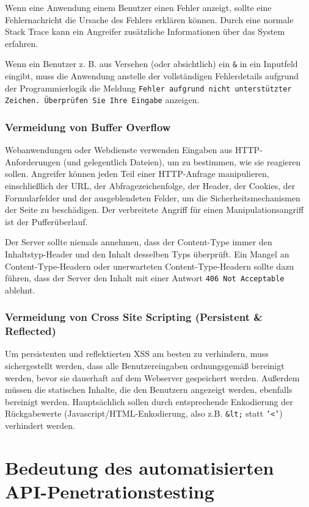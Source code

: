 Wenn eine Anwendung einem Benutzer einen Fehler anzeigt, sollte eine Fehlernachricht die Ursache des Fehlers erklären können. Durch eine normale Stack Trace kann ein Angreifer zusätzliche Informationen über das System erfahren.

Wenn ein Benutzer z. B. aus Versehen (oder absichtlich) ein \texttt{\&} in ein Inputfeld eingibt, muss die Anwendung anstelle der vollständigen Fehlerdetails aufgrund der Programmierlogik die Meldung \texttt{Fehler aufgrund nicht unterstützter Zeichen. Überprüfen Sie Ihre Eingabe} anzeigen\cite{ase17}.

\subsubsection{Vermeidung von Buffer Overflow}

Webanwendungen oder Webdienste verwenden Eingaben aus HTTP-Anforderungen (und gelegentlich Dateien), um zu bestimmen, wie sie reagieren sollen. Angreifer können jeden Teil einer HTTP-Anfrage manipulieren, einschließlich der URL, der Abfragezeichenfolge, der Header, der Cookies, der Formularfelder und der ausgeblendeten Felder, um die Sicherheitsmechanismen der Seite zu beschädigen. Der verbreitete Angriff für einen Manipulationsangriff ist der Pufferüberlauf.

Der Server sollte niemals annehmen, dass der Content-Type immer den Inhaltstyp-Header und den Inhalt desselben Typs überprüft. Ein Mangel an Content-Type-Headern oder unerwarteten Content-Type-Headern sollte dazu führen, dass der
Server den Inhalt mit einer Antwort \texttt{406 Not Acceptable} ablehnt\cite{bofangpre16}.

\subsubsection{Vermeidung von Cross Site Scripting (Persistent \& Reflected)}

Um persistenten und reflektierten XSS am besten zu verhindern, muss sichergestellt werden, dass alle Benutzereingaben ordnungsgemäß bereinigt werden, bevor sie dauerhaft auf dem Webserver gespeichert werden. Außerdem müssen die statischen Inhalte, die den Benutzern angezeigt werden, ebenfalls bereinigt werden. Hauptsächlich sollen durch entsprechende Enkodierung der Rückgabewerte (Javascript/HTML-Enkodierung, also z.B. \texttt{\&lt;} statt \texttt{'<'}) verhindert werden\cite{xsspersistent14}.

\section{Bedeutung des automatisierten API-Penetrationstesting}

